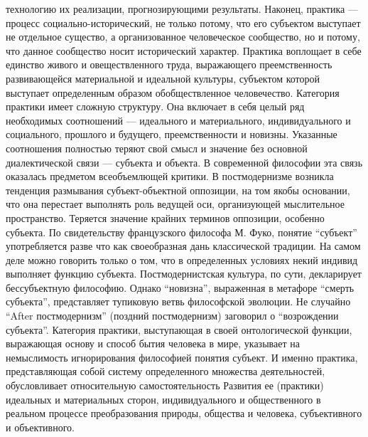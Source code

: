 \documentclass[12pt]{article}
\begin{document}
технологию  их  реализации,  прогнозирующими  результаты.  Наконец,  практика  —  процесс  социально-исторический,  не  только  потому,  что  его  субъектом  выступает  не  отдельное  существо,  а  организованное
человеческое  сообщество,  но  и  потому,  что  данное  сообщество  носит  исторический  характер.  Практика
воплощает в себе единство живого и овеществленного труда, выражающего преемственность развивающейся
материальной и идеальной культуры, субъектом которой выступает определенным образом обобществленное
человечество.
Категория практики имеет сложную структуру. Она включает в себя целый ряд необходимых соотношений —
идеального  и  материального,  индивидуального  и  социального,  прошлого  и  будущего,  преемственности  и
новизны. Указанные соотношения полностью теряют свой смысл и значение без основной диалектической
связи — субъекта и объекта.
В  современной  философии  эта  связь  оказалась  предметом  всеобъемлющей  критики.  В  постмодернизме
возникла тенденция размывания субъект-объектной оппозиции, на том якобы основании, что она перестает
выполнять роль ведущей оси, организующей мыслительное пространство. Теряется значение крайних терминов
оппозиции,  особенно  субъекта.  По  свидетельству  французского  философа  М.  Фуко,  понятие  “субъект”
употребляется разве что как своеобразная дань классической традиции. На самом деле можно говорить только о
том, что в определенных условиях некий индивид выполняет функцию субъекта. Постмодернистская культура,
по сути, декларирует бессубъектную философию. Однако “новизна”, выраженная в метафоре “смерть субъекта”,
представляет  тупиковую  ветвь  философской  эволюции.  Не  случайно  “After  постмодернизм”  (поздний
постмодернизм) заговорил о “возрождении субъекта”.
Категория практики, выступающая в своей онтологической функции, выражающая основу и способ бытия
человека в мире, указывает на немыслимость игнорирования философией понятия субъект. И именно практика,
представляющая  собой  систему  определенного  множества  деятельностей,  обусловливает  относительную
самостоятельность  Развития  ее  (практики)  идеальных  и  материальных  сторон,  индивидуального  и
общественного  в  реальном  процессе  преобразования  природы,  общества  и  человека,  субъективного  и
объективного.
\end{document}
